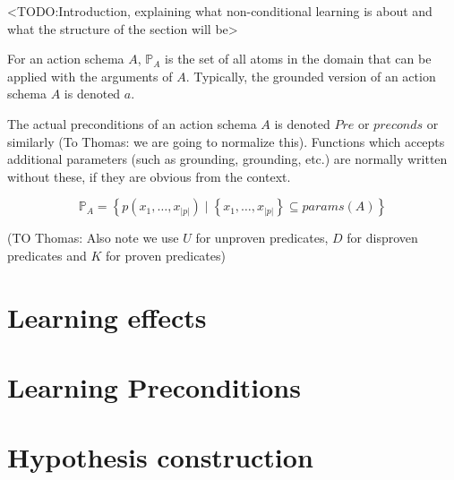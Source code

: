 \documentclass[Master.tex]{subfiles}
\begin{document}
<TODO:\@ Introduction, explaining what non-conditional learning is about and what the structure of the section will be>

For an action schema $A$, $\mathbb{P}_A$ is the set of all atoms in the domain that can be applied with the arguments of $A$. Typically, the grounded version of an action schema $A$ is denoted $a$.

The actual preconditions of an action schema $A$ is denoted $Pre$ or $preconds$ or similarly (To Thomas: we are going to normalize this). Functions which accepts additional parameters (such as grounding, grounding, etc.) are normally written without these, if they are obvious from the context.

\[
\mathbb{P}_A = \left\{
p \left( x_1, \dots, x_{|p|} \right)
\; | \; \left\{ x_1, \dots, x_{|p|} \right\} \subseteq params(A)
\right\}
\]


(TO Thomas: Also note we use $U$ for unproven predicates, $D$ for disproven predicates and $K$ for proven predicates)

\section{Learning effects}\label{sec:NC:Effects}
    

\section{Learning Preconditions}\label{sec:NC:Preconditions}
    

\section{Hypothesis construction}\label{sec:NC:hypcon}
	
\end{document}
